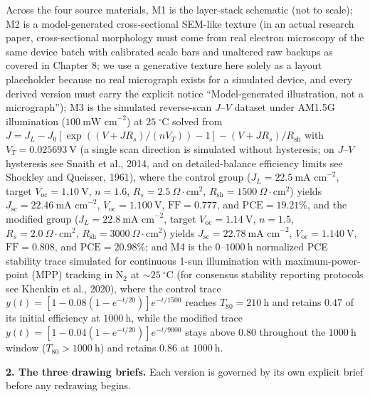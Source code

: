 Across the four source materials, M1 is the layer-stack schematic (not to scale); M2 is a model-generated cross-sectional SEM-like texture (in an actual research paper, cross-sectional morphology must come from real electron microscopy of the same device batch with calibrated scale bars and unaltered raw backups as covered in Chapter 8; we use a generative texture here solely as a layout placeholder because no real micrograph exists for a simulated device, and every derived version must carry the explicit notice ``Model-generated illustration, not a micrograph''); M3 is the simulated reverse-scan $J\text{--}V$ dataset under AM1.5G illumination ($100\ \text{mW cm}^{-2}$) at $25\ ^\circ\text{C}$ solved from $J = J_L - J_0[\exp((V + J R_s)/(n V_T)) - 1] - (V + J R_s)/R_{\text{sh}}$ with $V_T = 0.025693\ \text{V}$ (a single scan direction is simulated without hysteresis; on $J\text{--}V$ hysteresis see Snaith et al., 2014, and on detailed-balance efficiency limits see Shockley and Queisser, 1961), where the control group ($J_L = 22.5\ \text{mA cm}^{-2}$, target $V_{\text{oc}} = 1.10\ \text{V}$, $n = 1.6$, $R_s = 2.5\ \Omega\cdot\text{cm}^2$, $R_{\text{sh}} = 1500\ \Omega\cdot\text{cm}^2$) yields $J_{\text{sc}} = 22.46\ \text{mA cm}^{-2}$, $V_{\text{oc}} = 1.100\ \text{V}$, $\text{FF} = 0.777$, and $\text{PCE} = 19.21\%$, and the modified group ($J_L = 22.8\ \text{mA cm}^{-2}$, target $V_{\text{oc}} = 1.14\ \text{V}$, $n = 1.5$, $R_s = 2.0\ \Omega\cdot\text{cm}^2$, $R_{\text{sh}} = 3000\ \Omega\cdot\text{cm}^2$) yields $J_{\text{sc}} = 22.78\ \text{mA cm}^{-2}$, $V_{\text{oc}} = 1.140\ \text{V}$, $\text{FF} = 0.808$, and $\text{PCE} = 20.98\%$; and M4 is the $0\text{--}1000\ \text{h}$ normalized PCE stability trace simulated for continuous 1-sun illumination with maximum-power-point (MPP) tracking in $\text{N}_2$ at $\sim 25\ ^\circ\text{C}$ (for consensus stability reporting protocols see Khenkin et al., 2020), where the control trace $y(t) = [1 - 0.08(1 - e^{-t/20})]e^{-t/1500}$ reaches $T_{80} = 210\ \text{h}$ and retains $0.47$ of its initial efficiency at $1000\ \text{h}$, while the modified trace $y(t) = [1 - 0.04(1 - e^{-t/20})]e^{-t/9000}$ stays above $0.80$ throughout the $1000\ \text{h}$ window ($T_{80} > 1000\ \text{h}$) and retains $0.86$ at $1000\ \text{h}$.

\textbf{2. The three drawing briefs.} Each version is governed by its own explicit brief before any redrawing begins.

